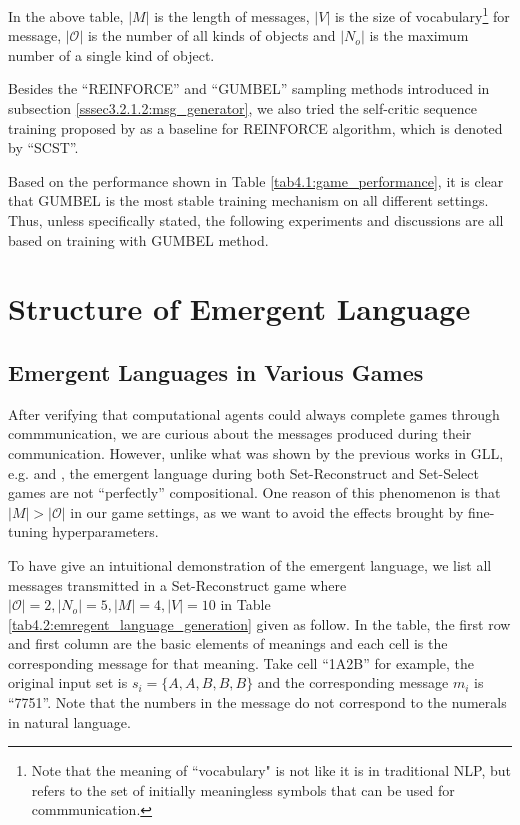 In the above table, $|M|$ is the length of messages, $|V|$ is the size of vocabulary\footnote{Note that the meaning of ``vocabulary" is not like it is in traditional NLP, but refers to the set of initially meaningless symbols that can be used for commmunication.} for message, $|\mathcal{O}|$ is the number of all kinds of objects and $|N_o|$ is the maximum number of a single kind of object.

Besides the ``REINFORCE'' and ``GUMBEL'' sampling methods introduced in subsection \ref{sssec3.2.1.2:msg_generator}, we also tried the self-critic sequence training proposed by \cite{rennie2017self} as a baseline for REINFORCE algorithm, which is denoted by ``SCST''.

Based on the performance shown in Table \ref{tab4.1:game_performance}, it is clear that GUMBEL is the most stable training mechanism on all different settings. Thus, unless specifically stated, the following experiments and discussions are all based on training with GUMBEL method.


\section{Structure of Emergent Language}
\label{sec4.2:structure_emergent_lan}

\subsection{Emergent Languages in Various Games}
\label{ssec4.2.1:emergent_languages}

After verifying that computational agents could always complete games through commmunication, we are curious about the messages produced during their communication. However, unlike what was shown by the previous works in GLL, e.g. \cite{hill2017understanding} and \cite{mordatch2018emergence}, the emergent language during both Set-Reconstruct and Set-Select games are not ``perfectly'' compositional. One reason of this phenomenon is that $|M| > |\mathcal{O}|$ in our game settings, as we want to avoid the effects brought by fine-tuning hyperparameters.

To have give an intuitional demonstration of the emergent language, we list all messages transmitted in a Set-Reconstruct game where $|\mathcal{O}|=2, |N_o|=5, |M|=4, |V|=10$ in Table \ref{tab4.2:emregent_language_generation} given as follow. In the table, the first row and first column are the basic elements of meanings and each cell is the corresponding message for that meaning. Take cell ``1A2B'' for example, the original input set is $s_i=\{A,A,B,B,B\}$ and the corresponding message $m_i$ is ``7751''. Note that the numbers in the message do not correspond to the numerals in natural language.

